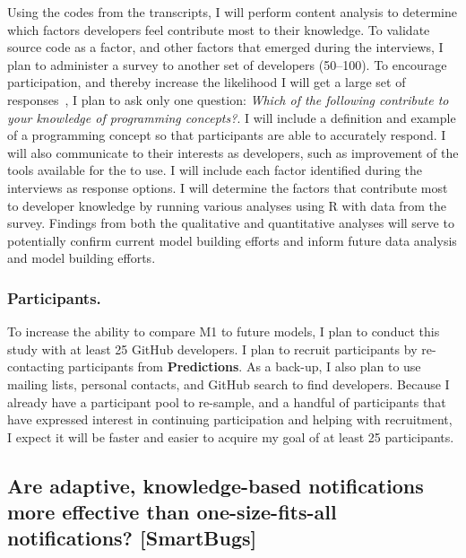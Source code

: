 \documentclass{llncs}
\begin{document}
Using the codes from the transcripts, I will perform content analysis to determine which factors developers feel contribute most to their knowledge.
To validate source code as a factor, and other factors that emerged during the interviews, I plan to administer a survey to another set of developers (50--100). To encourage participation, and thereby increase the likelihood I will get a large set of responses~\cite{smith2013improving}, I plan to ask only one question: \emph{Which of the following contribute to your knowledge of programming concepts?}. I will include a definition and example of a programming concept so that participants are able to accurately respond. I will also communicate to their interests as developers, such as improvement of the tools available for the to use.
I will include each factor identified during the interviews as response options.
I will determine the factors that contribute most to developer knowledge by running various analyses using R with data from the survey. Findings from both the qualitative and quantitative analyses will serve to potentially confirm current model building efforts and inform future data analysis and model building efforts.

\subsubsection{Participants.} To increase the ability to compare M1 to future models, I plan to conduct this study with at least 25 GitHub developers. I plan to recruit participants by re-contacting participants from \textbf{Predictions}. As a back-up, I also plan to use mailing lists, personal contacts, and GitHub search to find developers. Because I already have a participant pool to re-sample, and a handful of participants that have expressed interest in continuing participation and helping with recruitment, I expect it will be faster and easier to acquire my goal of at least 25 participants.

\subsection{Are adaptive, knowledge-based notifications more effective than one-size-fits-all notifications? [SmartBugs]} \label{subsec:s5}
\end{document}
